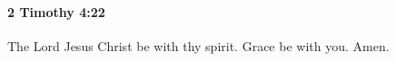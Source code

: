 		\paragraph{2 Timothy 4:22} %
			\label{2TIMOTHY-4-22}

			The Lord Jesus Christ be with thy spirit.  Grace be with you.  Amen.

			\begin{framed}
			\scriptsize
				\begin{compactdesc}
					\item[SBLG] 
				\end{compactdesc}
			\end{framed}